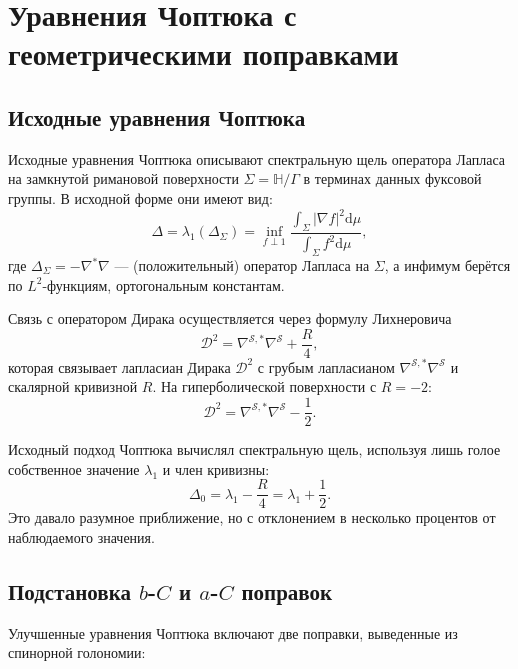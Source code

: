 \documentclass[12pt,a4paper]{article}
\theoremstyle{definition}
\theoremstyle{remark}
\newcommand{\HH}{\mathbb{H}}
\newcommand{\cD}{\mathcal{D}}
\newcommand{\cS}{\mathcal{S}}
\newcommand{\dd}{\mathrm{d}}
\begin{document}
\section{Уравнения Чоптюка с геометрическими поправками}
\label{sec:choptyuk}

\subsection{Исходные уравнения Чоптюка}

Исходные уравнения Чоптюка описывают спектральную щель оператора Лапласа на замкнутой римановой поверхности $\Sigma = \HH/\Gamma$ в терминах данных фуксовой группы. В исходной форме они имеют вид:
\begin{equation}
\Delta = \lambda_1(\Delta_\Sigma) = \inf_{f \perp 1} \frac{\int_\Sigma |\nabla f|^2 \dd\mu}{\int_\Sigma f^2 \dd\mu},
\end{equation}
где $\Delta_\Sigma = -\nabla^*\nabla$ --- (положительный) оператор Лапласа на $\Sigma$, а инфимум берётся по $L^2$-функциям, ортогональным константам.

Связь с оператором Дирака осуществляется через формулу Лихнеровича
\begin{equation}
\cD^2 = \nabla^{\cS,*}\nabla^{\cS} + \frac{R}{4},
\end{equation}
которая связывает лапласиан Дирака $\cD^2$ с грубым лапласианом $\nabla^{\cS,*}\nabla^{\cS}$ и скалярной кривизной $R$. На гиперболической поверхности с $R = -2$:
\begin{equation}
\cD^2 = \nabla^{\cS,*}\nabla^{\cS} - \frac{1}{2}.
\end{equation}

Исходный подход Чоптюка вычислял спектральную щель, используя лишь голое собственное значение $\lambda_1$ и член кривизны:
\begin{equation}
\Delta_0 = \lambda_1 - \frac{R}{4} = \lambda_1 + \frac{1}{2}.
\end{equation}
Это давало разумное приближение, но с отклонением в несколько процентов от наблюдаемого значения.

\subsection{Подстановка $b$-$C$ и $a$-$C$ поправок}

Улучшенные уравнения Чоптюка включают две поправки, выведенные из спинорной голономии:
\end{document}
